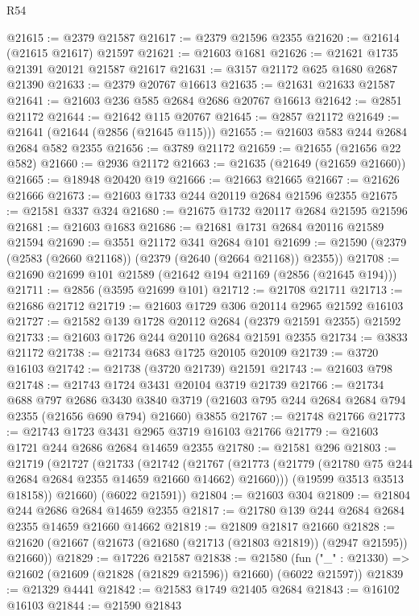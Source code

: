 \begin{lexlean}{R54}
\begin{coremodule}
@21615 := @2379 @21587
@21617 := @2379 @21596 @2355
@21620 := @21614 (@21615 @21617) @21597
@21621 := @21603 @1681
@21626 := @21621 @1735 @21391 @20121 @21587 @21617
@21631 := @3157 @21172 @625 @1680 @2687 @21390
@21633 := @2379 @20767 @16613
@21635 := @21631 @21633 @21587
@21641 := @21603 @236 @585 @2684 @2686 @20767 @16613
@21642 := @2851 @21172
@21644 := @21642 @115 @20767
@21645 := @2857 @21172
@21649 := @21641 (@21644 (@2856 (@21645 @115)))
@21655 := @21603 @583 @244 @2684 @2684 @582 @2355
@21656 := @3789 @21172
@21659 := @21655 (@21656 @22 @582)
@21660 := @2936 @21172
@21663 := @21635 (@21649 (@21659 @21660))
@21665 := @18948 @20420 @19
@21666 := @21663 @21665
@21667 := @21626 @21666
@21673 := @21603 @1733 @244 @20119 @2684 @21596 @2355
@21675 := @21581 @337 @324
@21680 := @21675 @1732 @20117 @2684 @21595 @21596
@21681 := @21603 @1683
@21686 := @21681 @1731 @2684 @20116 @21589 @21594
@21690 := @3551 @21172 @341 @2684 @101
@21699 := @21590 (@2379 (@2583 (@2660 @21168)) (@2379 (@2640 (@2664 @21168)) @2355))
@21708 := @21690 @21699 @101 @21589 (@21642 @194 @21169 (@2856 (@21645 @194)))
@21711 := @2856 (@3595 @21699 @101)
@21712 := @21708 @21711
@21713 := @21686 @21712
@21719 := @21603 @1729 @306 @20114 @2965 @21592 @16103
@21727 := @21582 @139 @1728 @20112 @2684 (@2379 @21591 @2355) @21592
@21733 := @21603 @1726 @244 @20110 @2684 @21591 @2355
@21734 := @3833 @21172
@21738 := @21734 @683 @1725 @20105 @20109
@21739 := @3720 @16103
@21742 := @21738 (@3720 @21739) @21591
@21743 := @21603 @798
@21748 := @21743 @1724 @3431 @20104 @3719 @21739
@21766 := @21734
    @688
    @797
    @2686
    @3430
    @3840
    @3719
    (@21603 @795 @244 @2684 @2684 @794 @2355 (@21656 @690 @794) @21660)
    @3855
@21767 := @21748 @21766
@21773 := @21743 @1723 @3431 @2965 @3719 @16103 @21766
@21779 := @21603 @1721 @244 @2686 @2684 @14659 @2355
@21780 := @21581 @296
@21803 := @21719
    (@21727
      (@21733
        (@21742
          (@21767 (@21773 (@21779 (@21780 @75 @244 @2684 @2684 @2355 @14659 @21660 @14662) @21660)))
          (@19599 @3513 @3513 @18158))
        @21660)
      (@6022 @21591))
@21804 := @21603 @304
@21809 := @21804 @244 @2686 @2684 @14659 @2355
@21817 := @21780 @139 @244 @2684 @2684 @2355 @14659 @21660 @14662
@21819 := @21809 @21817 @21660
@21828 := @21620 (@21667 (@21673 (@21680 (@21713 (@21803 @21819)) (@2947 @21595)) @21660))
@21829 := @17226 @21587
@21838 := @21580
    (fun ("_" : @21330) => @21602 (@21609 (@21828 (@21829 @21596)) @21660) (@6022 @21597))
@21839 := @21329 @4441
@21842 := @21583 @1749 @21405 @2684
@21843 := @16102 @16103
@21844 := @21590 @21843

\end{coremodule}
\end{lexlean}
